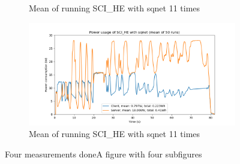 \documentclass[../thesis.tex]{subfiles}
\begin{document}
\begin{figure}[hbt!]
\begin{subfigure}{\linewidth}
            \caption{Mean of running SCI\_HE with sqnet 11 times}
            \label{fig:bmean_SCI_{HE}_sqnet}
    \end{subfigure}
    \begin{subfigure}{\linewidth}
            \includegraphics[width=\textwidth]{Thesis/Images/Means/mean_SCI_HE-sqnet.png}
            \caption{Mean of running SCI\_HE with sqnet 11 times}
            \label{fig:bfmean_SCI_{HE}_sqnet}
    \end{subfigure}

    \caption{Four measurements doneA figure with four subfigures}
    \label{fig:4results2}
\end{figure}

\noindent

\end{document}

